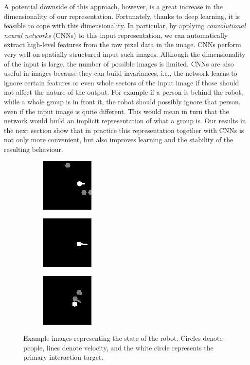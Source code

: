 \documentclass[letterpaper, 10 pt, conference]{ieeeconf}
\begin{document}
A potential downside of this approach, however, is a great increase in the dimensionality of our representation.  Fortunately, thanks to deep learning, it is feasible to cope with this dimensionality.  In particular, by applying \emph{convolutional neural networks} (CNNs) to this input representation, we can automatically extract high-level features from the raw pixel data in the image. CNNs perform very well on spatially structured input such images.  Although the  dimensionality of the input is large, the number of possible images is limited. CNNs are also useful in images because they can build invariances, i.e., the network learns to ignore certain features or even whole sectors of the input image if those should not affect the nature of the output. For example if a person is behind the robot, while a whole group is in front it, the robot should possibly ignore that person, even if the input image is quite different. This would mean in turn that the network would build an implicit representation of what a group is. Our results in the next section show that in practice this representation together with CNNs is not only more convenient, but also improves learning and the stability of the resulting behaviour.

  	\begin{figure}[tbh]
  	\centering
      \begin{subfigure}[b]{0.30\columnwidth}
    \includegraphics[scale = 0.80]{images/state1.png}
    \label{fig:state1}
  \end{subfigure}
  \begin{subfigure}[b]{0.30\columnwidth}
    \includegraphics[scale = 0.80]{images/state2.png}
       \label{fig:state2}
  \end{subfigure} 
    \begin{subfigure}[b]{0.30\columnwidth}
    \includegraphics[scale = 0.80]{images/state3.png}
       \label{fig:state3}
  \end{subfigure}
  \caption{Example images representing the state of the robot. Circles denote people, lines denote velocity, and the white circle represents the primary interaction target.}

    \vspace{-2mm}
  \label{fig:state}
  \end{figure}
\end{document}
